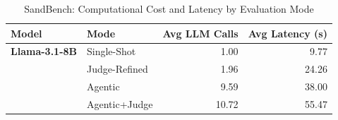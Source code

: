 \begin{table}[ht]
\centering
\caption{SandBench: Computational Cost and Latency by Evaluation Mode}
\label{tab:cost_latency}
\begin{tabular}{llrr}
\toprule
Model & Mode & Avg LLM Calls & Avg Latency (s) \\
\midrule
\textbf{Llama-3.1-8B} & Single-Shot & 1.00 & 9.77 \\
 & Judge-Refined & 1.96 & 24.26 \\
 & Agentic & 9.59 & 38.00 \\
 & Agentic+Judge & 10.72 & 55.47 \\
\bottomrule
\end{tabular}
\end{table}